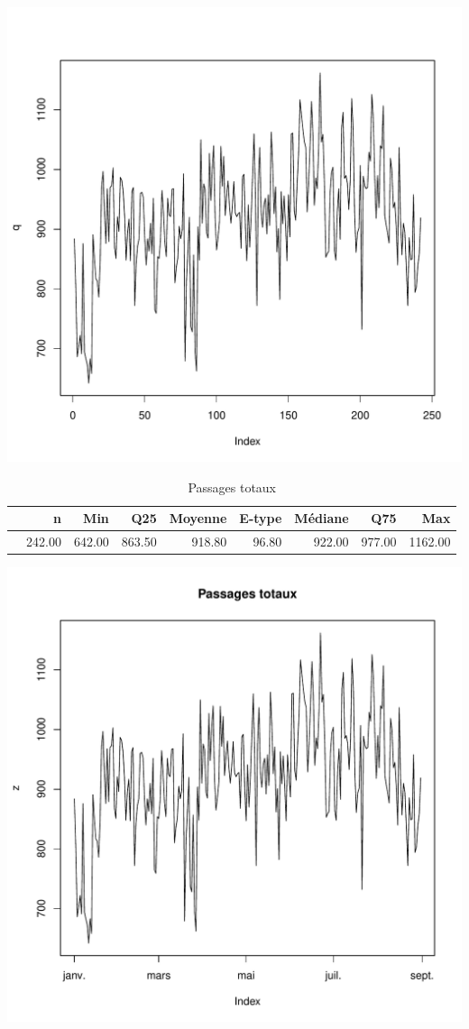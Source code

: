 \documentclass[12pt,english,french,twoside]{report}\usepackage[]{graphicx}\usepackage[]{color}
\makeatletter
\def\maxwidth{ %
  \ifdim\Gin@nat@width>\linewidth
    \linewidth
  \else
    \Gin@nat@width
  \fi
}
\makeatother
\begin{document}
\includegraphics[width=\maxwidth]{figure/passages_totaux1} 
\begin{table}[ht]
\centering
\begin{tabular}{rrrrrrrrr}
  \hline
 & n & Min & Q25 & Moyenne & E-type & Médiane & Q75 & Max \\ 
  \hline
 & 242.00 & 642.00 & 863.50 & 918.80 & 96.80 & 922.00 & 977.00 & 1162.00 \\ 
   \hline
\end{tabular}
\caption[Passages totaux]{Passages totaux} 
\label{tab:pt}
\end{table}

\includegraphics[width=\maxwidth]{figure/passages_totaux2} 
\end{document}
